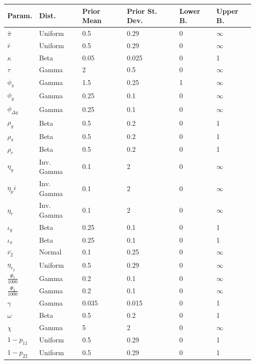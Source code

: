 \documentclass[12pt]{article}
\numberwithin{equation}{section}
\begin{document}
\begin{table}[hbt!]
\begin{tabular}{l|lll|ll}
Param. & Dist. & Prior Mean & Prior St. Dev. & Lower B. & Upper B. \\
\hline
\hline
$\bar{\pi}$ & Uniform & 0.5 & 0.29 & 0 & $\infty$ \\
$\bar{r}$ & Uniform & 0.5 & 0.29 & 0 & $\infty$ \\
$\kappa$ & Beta & 0.05 & 0.025 & 0 & 1 \\
$\tau$ & Gamma & 2 & 0.5 & 0 & $\infty$ \\
$\phi_{\pi}$ & Gamma & 1.5 & 0.25 & 1 & $\infty$ \\
$\phi_y$ & Gamma & 0.25 & 0.1 & 0 & $\infty$ \\
$\phi_{\Delta y}$ & Gamma & 0.25 & 0.1 & 0 & $\infty$ \\
$\rho_y$ & Beta & 0.5 & 0.2 & 0 & 1 \\
$\rho_{\pi}$ & Beta & 0.5 & 0.2 & 0 & 1 \\
$\rho_r$ & Beta & 0.5 & 0.2 & 0 & 1 \\
$\eta_y$ & Inv. Gamma & 0.1 & 2 & 0 & $\infty$ \\
$\eta_pi$ & Inv. Gamma & 0.1 & 2 & 0 & $\infty$ \\
$\eta_r$ & Inv. Gamma & 0.1 & 2 & 0 & $\infty$ \\
$\iota_y$ & Beta & 0.25 & 0.1 & 0 & 1 \\
$\iota_{\pi}$ & Beta & 0.25 & 0.1 & 0 & 1 \\
$\bar{r_2}$ & Normal & 0.1 & 0.25 & 0 & $\infty$ \\
$\eta_{r_2}$ & Uniform & 0.5 & 0.29 & 0 & $\infty$ \\
$\frac{\Phi_1}{1000}$ & Gamma & 0.2 & 0.1 & 0 & $\infty$ \\
$\frac{\Phi_2}{1000}$ & Gamma & 0.2 & 0.1 & 0 & $\infty$ \\
$\gamma$ & Gamma & 0.035 & 0.015 & 0 & 1 \\
$\omega$ & Beta & 0.5 & 0.2 & 0 & 1 \\
$\chi$ & Gamma & 5 & 2 & 0 & $\infty$ \\
$1-p_{11}$ & Uniform & 0.5 & 0.29 & 0 & 1 \\
$1-p_{22}$ & Uniform & 0.5 & 0.29 & 0 & 1
\end{tabular}
\end{table}
\end{document}
